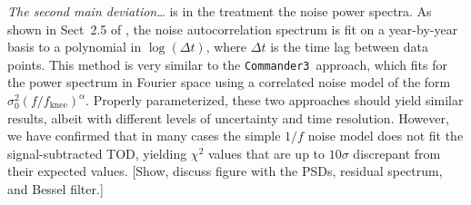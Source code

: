 \documentclass[twocolumn]{../../common/aa}
\def\commander{\texttt{Commander}}
\def\commanderthree{\texttt{Commander3}}
\newcommand{\K}[0]{\textit K}
\begin{document}




%



\lipsum[1]







\textit{The second main deviation\ldots} is in the treatment the noise power spectra. As shown
in Sect~2.5 of \citet{jarosik2007}, the noise autocorrelation spectrum is fit
on a year-by-year basis to a polynomial in $\log(\Delta t)$, where $\Delta t$
is the time lag between data points. This method is very similar to the
\commanderthree\ approach, which fits for the power spectrum in Fourier space
using a correlated noise model of the form
$\sigma_0^2(f/f_\mathrm{knee})^{\alpha}$. Properly parameterized, these two
approaches should yield similar results, albeit with different levels of
uncertainty and time resolution. However, we have confirmed that in many cases
the simple $1/f$ noise model does not fit the signal-subtracted TOD, yielding
$\chi^2$ values that are up to $10\sigma$ discrepant from their expected
values.  [Show, discuss figure with the PSDs, residual spectrum, and Bessel
filter.]
\end{document}
